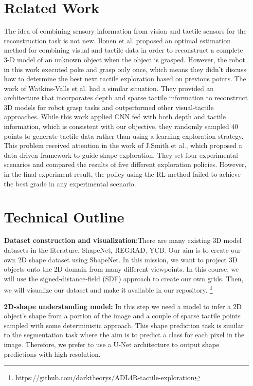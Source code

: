 \documentclass[conference]{IEEEtran}
\begin{document}
\section{Related Work}
The idea of combining sensory information from vision and tactile sensors for the reconstruction task is not new. Ilonen et al.\cite{6631074} proposed an optimal estimation method for combining visual and tactile data in order to reconstruct a complete 3-D model of  an unknown object when the object is grasped.  However, the robot in this work executed poke and grasp only once, which means they didn’t discuss how to determine the best next tactile exploration based on previous points. The work of Watkins-Valls et al. had a similar situation.\cite{https://doi.org/10.48550/arxiv.1803.07671}  They provided an architecture that incorporates depth and sparse tactile information to reconstruct 3D models for robot grasp tasks and outperformed other visual-tactile approaches. While this work applied CNN fed with both depth and tactile information, which is consistent with our objective, they randomly sampled 40 points to generate tactile data rather than using a learning exploration strategy. This problem received attention in the work of J.Smith et al.\cite{https://doi.org/10.48550/arxiv.2107.09584}, which proposed a data-driven framework to guide shape exploration. They set four experimental scenarios and compared the results of five different exploration policies. However, in the final experiment result, the policy using the RL method failed to achieve the best grade in any experimental scenario. 

\section{Technical Outline}
\textbf{Dataset construction and visualization:}There are many existing 3D model datasets in the literature, ShapeNet\cite{https://doi.org/10.48550/arxiv.1512.03012}, REGRAD\cite{https://doi.org/10.48550/arxiv.2104.14118}, YCB\cite{Calli_2015}. Our aim is to create our own 2D shape dataset using ShapeNet. In this mission, we want to project 3D objects onto the 2D domain from many different viewpoints. In this course, we will use the signed-distance-field (SDF) approach to create our own grids. Then, we will visualize our dataset and make it available in our repository. \footnote{https://github.com/darktheorys/ADL4R-tactile-exploration} 

\textbf{2D-shape understanding model:} In this step we need a model to infer a 2D object's shape from a portion of the image and a couple of sparse tactile points sampled with some deterministic approach. This shape prediction task is similar to the segmentation task where the aim is to predict a class for each pixel in the image. Therefore, we prefer to use a U-Net\cite{https://doi.org/10.48550/arxiv.1505.04597} architecture to output shape predictions with high resolution.
\end{document}
